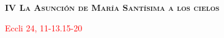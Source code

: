 \begin{center}
    \textbf{\textsc{IV La Asunción de María Santísima a los cielos}}
    
    \textcolor{red}{Eccli 24, 11-13.15-20}    
\end{center}

